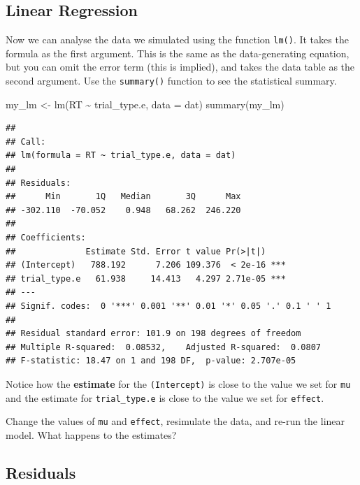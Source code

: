 \documentclass[
  oneside]{book}
\newenvironment{Shaded}{\begin{snugshade}}{\end{snugshade}}
\newcommand{\AttributeTok}[1]{\textcolor[rgb]{0.77,0.63,0.00}{#1}}
\newcommand{\FunctionTok}[1]{\textcolor[rgb]{0.00,0.00,0.00}{#1}}
\newcommand{\NormalTok}[1]{#1}
\newcommand{\OtherTok}[1]{\textcolor[rgb]{0.56,0.35,0.01}{#1}}
\newcommand{\SpecialCharTok}[1]{\textcolor[rgb]{0.00,0.00,0.00}{#1}}
\begin{document}
\hypertarget{linear-regression}{%
\subsection{Linear Regression}\label{linear-regression}}

Now we can analyse the data we simulated using the function \texttt{lm()}. It takes the formula as the first argument. This is the same as the data-generating equation, but you can omit the error term (this is implied), and takes the data table as the second argument. Use the \texttt{summary()} function to see the statistical summary.

\begin{Shaded}
\begin{Highlighting}[]
\NormalTok{my\_lm }\OtherTok{\textless{}{-}} \FunctionTok{lm}\NormalTok{(RT }\SpecialCharTok{\textasciitilde{}}\NormalTok{ trial\_type.e, }\AttributeTok{data =}\NormalTok{ dat)}
\FunctionTok{summary}\NormalTok{(my\_lm)}
\end{Highlighting}
\end{Shaded}

\begin{verbatim}
## 
## Call:
## lm(formula = RT ~ trial_type.e, data = dat)
## 
## Residuals:
##      Min       1Q   Median       3Q      Max 
## -302.110  -70.052    0.948   68.262  246.220 
## 
## Coefficients:
##              Estimate Std. Error t value Pr(>|t|)    
## (Intercept)   788.192      7.206 109.376  < 2e-16 ***
## trial_type.e   61.938     14.413   4.297 2.71e-05 ***
## ---
## Signif. codes:  0 '***' 0.001 '**' 0.01 '*' 0.05 '.' 0.1 ' ' 1
## 
## Residual standard error: 101.9 on 198 degrees of freedom
## Multiple R-squared:  0.08532,    Adjusted R-squared:  0.0807 
## F-statistic: 18.47 on 1 and 198 DF,  p-value: 2.707e-05
\end{verbatim}

Notice how the \textbf{estimate} for the \texttt{(Intercept)} is close to the value we set for \texttt{mu} and the estimate for \texttt{trial\_type.e} is close to the value we set for \texttt{effect}.

\begin{try}
Change the values of \texttt{mu} and \texttt{effect}, resimulate the data, and re-run the linear model. What happens to the estimates?

\end{try}

\hypertarget{residuals}{%
\subsection{Residuals}\label{residuals}}
\end{document}
